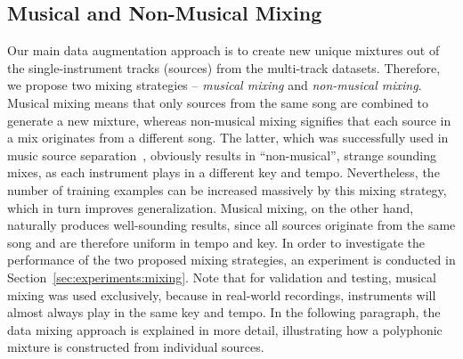 \documentclass{article}
\begin{document}
\subsection{Musical and Non-Musical Mixing}
\label{sec:method:dataloading}
Our main data augmentation approach is to create new unique mixtures out of the single-instrument tracks (sources) from the multi-track datasets. Therefore, we propose two mixing strategies -- \textit{musical mixing} and \textit{non-musical mixing}. Musical mixing means that only sources from the same song are combined to generate a new mixture, whereas non-musical mixing signifies that each source in a mix originates from a different song. The latter, which was successfully used in music source separation~\cite{uhlich2017improving}, obviously results in \enquote{non-musical}, strange sounding mixes, as each instrument plays in a different key and tempo. Nevertheless, the number of training examples can be increased massively by this mixing strategy, which in turn improves generalization. Musical mixing, on the other hand, naturally produces well-sounding results, since all sources originate from the same song and are therefore uniform in tempo and key. In order to investigate the performance of the two proposed mixing strategies, an experiment is conducted in Section~\ref{sec:experiments:mixing}. Note that for validation and testing, musical mixing was used exclusively, because in real-world recordings, instruments will almost always play in the same key and tempo. In the following paragraph, the data mixing approach is explained in more detail, illustrating how a polyphonic mixture is constructed from individual sources.
\end{document}
